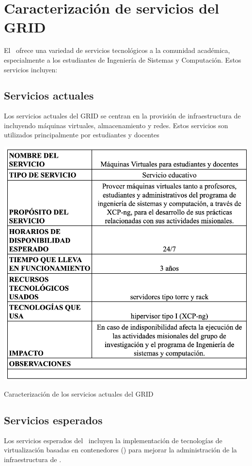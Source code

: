 \section{Caracterización de servicios del GRID}
El \GRID\ ofrece una variedad de servicios tecnológicos a la comunidad académica, especialmente a los estudiantes de Ingeniería de Sistemas y Computación. Estos servicios incluyen:

\subsection{Servicios actuales}
Los servicios actuales del GRID se centran en la provisión de infraestructura de \TI\, incluyendo máquinas virtuales, almacenamiento y redes. Estos servicios son utilizados principalmente por estudiantes y docentes

\begin{table}[H]
    \centering
    \includegraphics[width=\textwidth]{tablas-images/cp1/servicios-actuales/servicios-actuales.png}
    \caption{Caracterización de los servicios actuales del GRID}\label{tab:servicios-actuales}
\end{table}

\subsection{Servicios esperados}
Los servicios esperados del \GRID\ incluyen la implementación de tecnologías de virtualización basadas en contenedores (\VBC) para mejorar la administración de la infraestructura de \TI.

